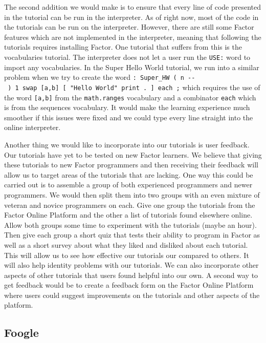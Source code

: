 \documentclass[
]{article}
\begin{document}
The second addition we would make is to ensure that every line of code
presented in the tutorial can be run in the interpreter. As of right
now, most of the code in the tutorials can be run on the interpreter.
However, there are still some Factor features which are not implemented
in the interpreter, meaning that following the tutorials requires
installing Factor. One tutorial that suffers from this is the
vocabularies tutorial. The interpreter does not let a user run the
\texttt{USE:} word to import any vocabularies. In the Super Hello World
tutorial, we run into a similar problem when we try to create the word
\texttt{:\ Super\_HW\ (\ n\ -\/-\ )\ 1\ swap\ {[}a,b{]}\ {[}\ "Hello\ World"\ print\ .\ {]}\ each\ ;}
which requires the use of the word \texttt{{[}a,b{]}} from the
\texttt{math.ranges} vocabulary and a combinator \texttt{each} which is
from the sequences vocabulary. It would make the learning experience
much smoother if this issues were fixed and we could type every line
straight into the online interpreter.

Another thing we would like to incorporate into our tutorials is user
feedback. Our tutorials have yet to be tested on new Factor learners. We
believe that giving these tutorials to new Factor programmers and then
receiving their feedback will allow us to target areas of the tutorials
that are lacking. One way this could be carried out is to assemble a
group of both experienced programmers and newer programmers. We would
then split them into two groups with an even mixture of veteran and
novice programmers on each. Give one group the tutorials from the Factor
Online Platform and the other a list of tutorials found elsewhere
online. Allow both groups some time to experiment with the tutorials
(maybe an hour). Then give each group a short quiz that tests their
ability to program in Factor as well as a short survey about what they
liked and disliked about each tutorial. This will allow us to see how
effective our tutorials our compared to others. It will also help
identity problems with our tutorials. We can also incorporate other
aspects of other tutorials that users found helpful into our own. A
second way to get feedback would be to create a feedback form on the
Factor Online Platform where users could suggest improvements on the
tutorials and other aspects of the platform.

\hypertarget{foogle}{%
\subsection{Foogle}\label{foogle}}
\end{document}
